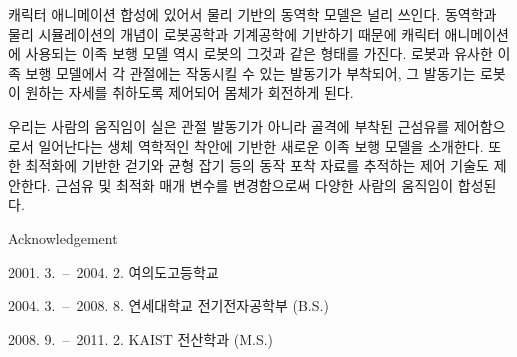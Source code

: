 \documentclass[master,english,final]{kaist-ucs}
\begin{document}
\begin{summary}

캐릭터 애니메이션 합성에 있어서 물리 기반의 동역학 모델은 널리 쓰인다.
동역학과 물리 시뮬레이션의 개념이 로봇공학과 기계공학에 기반하기 때문에
캐릭터 애니메이션에 사용되는 이족 보행 모델 역시 로봇의 그것과 같은
형태를 가진다. 로봇과 유사한 이족 보행 모델에서 각 관절에는 작동시킬 수 있는 발동기가
부착되어, 그 발동기는 로봇이 원하는 자세를 취하도록 제어되어 몸체가 회전하게 된다.

우리는 사람의 움직임이 실은 관절 발동기가 아니라 골격에 부착된 근섬유를
제어함으로서 일어난다는 생체 역학적인 착안에 기반한 새로운 이족 보행 모델을 소개한다.
또한 최적화에 기반한 걷기와 균형 잡기 등의 동작 포착 자료를 추적하는 제어 기술도
제안한다. 근섬유 및 최적화 매개 변수를 변경함으로써 다양한 사람의 움직임이
합성된다.

\end{summary}





\acknowledgement

Acknowledgement


\curriculumvitae[korean]

    \begin{personaldata}
        \address    {서울특별시 영등포구 여의도동 대교아파트 5동 1213호}
    \end{personaldata}

    \begin{education}
        \item[2001. 3.\ --\ 2004. 2.] 여의도고등학교
        \item[2004. 3.\ --\ 2008. 8.] 연세대학교 전기전자공학부 (B.S.)
        \item[2008. 9.\ --\ 2011. 2.] KAIST 전산학과 (M.S.)
    \end{education}
\end{document}
